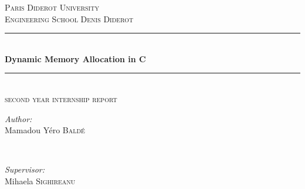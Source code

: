 \documentclass[11pt]{article}
\begin{document}
\begin{titlepage}

\newcommand{\HRule}{\rule{\linewidth}{0.5mm}} %

\center %
 

\textsc{\LARGE Paris Diderot University}\\[1.5cm]
\textsc{\Large Engineering School Denis Diderot}\\[0.5cm] 



\HRule \\[0.4cm]
{ \huge \bfseries Dynamic Memory Allocation in C}\\[0.4cm] 
\HRule \\[1.5cm]
 
 \textsc{\large second year internship report}\\[1.5cm] 

\begin{minipage}{0.4\textwidth}
\begin{flushleft} \large
\emph{Author:}\\
Mamadou Yéro \textsc{Baldé} %
\end{flushleft}
\end{minipage}
~
\begin{minipage}{0.4\textwidth}
\begin{flushright} \large
\emph{Supervisor:} \\
Mihaela \textsc{Sighireanu} %
\end{flushright}
\end{minipage}\\[2cm]



\end{titlepage}
\end{document}
